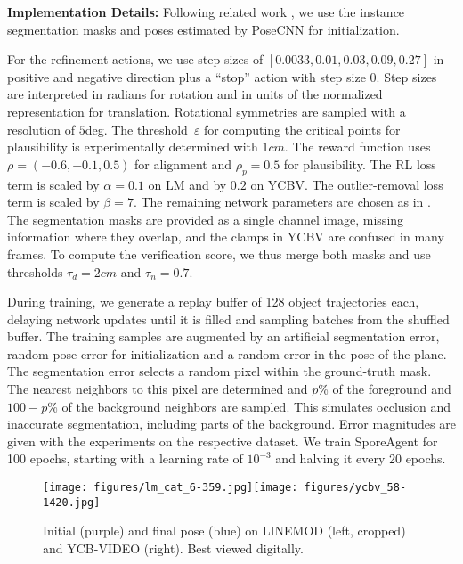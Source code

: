 \documentclass[10pt,twocolumn,letterpaper]{article}
\begin{document}
\textbf{Implementation Details:} 
Following related work \cite{shao2020pfrl,li2018deepim,deng2021poserbpf,labbe2020cosypose}, we use the instance segmentation masks and poses estimated by PoseCNN \cite{xiang2017posecnn} for initialization.

For the refinement actions, we use step sizes of $[0.0033, 0.01, 0.03, 0.09, 0.27]$ in positive and negative direction plus a ``stop'' action with step size $0$. Step sizes are interpreted in radians for rotation and in units of the normalized representation for translation. Rotational symmetries are sampled with a resolution of $5$deg. The threshold~$\varepsilon$ for computing the critical points for plausibility is experimentally determined with $1cm$. The reward function uses $\rho=(-0.6,-0.1,0.5)$ for alignment and $\rho_p=0.5$ for plausibility. The RL loss term is scaled by $\alpha=0.1$ on LM and by $0.2$ on YCBV. The outlier-removal loss term is scaled by $\beta=7$. The remaining network parameters are chosen as in \cite{bauer2021reagent}. The segmentation masks are provided as a single channel image, missing information where they overlap, and the clamps in YCBV are confused in many frames. To compute the verification score, we thus merge both masks and use thresholds $\tau_d=2cm$ and $\tau_n=0.7$.

During training, we generate a replay buffer of 128 object trajectories each, delaying network updates until it is filled and sampling batches from the shuffled buffer. The training samples are augmented by an artificial segmentation error, random pose error for initialization and a random error in the pose of the plane. The segmentation error selects a random pixel within the ground-truth mask. The nearest neighbors to this pixel are determined and $p$\% of the foreground and $100-p$\% of the background neighbors are sampled. This simulates occlusion and inaccurate segmentation, including parts of the background. Error magnitudes are given with the experiments on the respective dataset. We train SporeAgent for 100 epochs, starting with a learning rate of $10^{-3}$ and halving it every 20 epochs.

\begin{figure}
    \centering
    \texttt{[image: figures/lm\_cat\_6-359.jpg]}\texttt{[image: figures/ycbv\_58-1420.jpg]}
    \caption{Initial (purple) and final pose (blue) on LINEMOD (left, cropped) and YCB-VIDEO (right). Best viewed digitally.}
    \label{fig:qualitative}
\end{figure}
\end{document}
